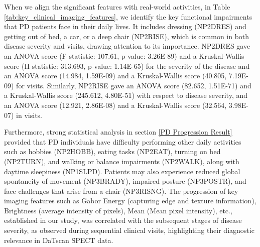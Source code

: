\documentclass{article}
\begin{document}

When we align the significant features with real-world activities, in Table \ref{tab:key_clinical_imaging_features}, we identify the key functional impairments that PD patients face in their daily lives. It includes dressing (NP2DRES) and getting out of bed, a car, or a deep chair (NP2RISE), which is common in both disease severity and visits, drawing attention to its importance. NP2DRES gave an ANOVA score (F statistic: 107.61, p-value: 3.26E-89) and a Kruskal-Wallis score (H statistic: 313.693, p-value: 1.14E-65) for the severity of the disease and an ANOVA score (14.984, 1.59E-09) and a Kruskal-Wallis score (40.805, 7.19E-09) for visits. Similarly, NP2RISE gave an ANOVA score (82.652, 1.51E-71) and a Kruskal-Wallis score (245.612, 4.80E-51) with respect to disease severity, and an ANOVA score (12.921, 2.86E-08) and a Kruskal-Wallis score (32.564, 3.98E-07) in visits. 

Furthermore, strong statistical analysis in section \ref{PD Progression Result} provided that PD individuals have difficulty performing other daily activities such as hobbies (NP2HOBB), eating tasks (NP2EAT), turning on bed (NP2TURN), and walking or balance impairments (NP2WALK), along with daytime sleepiness (NP1SLPD). Patients may also experience reduced global spontaneity of movement (NP3BRADY), impaired posture (NP3POSTR), and face challenges that arise from a chair (NP3RISNG). The progression of key imaging features such as Gabor Energy (capturing edge and texture information), Brightness (average intensity of pixels), Mean (Mean pixel intensity), etc., established in our study, was correlated with the subsequent stages of disease severity, as observed during sequential clinical visits, highlighting their diagnostic relevance in DaTscan SPECT data.
\end{document}
